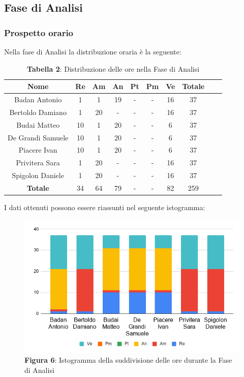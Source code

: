\subsection{Fase di Analisi}
\subsubsection{Prospetto orario}
Nella fase di Analisi la distribuzione oraria è la seguente:
\begin{table}[H]
	\centering
	\renewcommand{\arraystretch}{1.5}
	\begin{tabular}{|c|c|c|c|c|c|c|c|c|c|}
		\hline
		\rowcolor{lighter-grayer}
Nome & Re & Am & An & Pt & Pm & Ve & Totale \\ \hline
Badan Antonio & 1 & 1 & 19 & - & - & 16 & 37 \\ \hline
Bertoldo Damiano & 1 & 20 & - & - & - & 16 & 37 \\ \hline
Budai Matteo & 10 & 1 & 20 & - & - & 6 & 37 \\ \hline
De Grandi Samuele & 10 & 1 & 20 & - & - & 6 & 37 \\ \hline
Piacere Ivan & 10 & 1 & 20 & - & - & 6 & 37 \\ \hline
Privitera Sara & 1 & 20 & - & - & - & 16 & 37 \\ \hline
Spigolon Daniele & 1 & 20 & - & - & - & 16 & 37 \\ \hline
\textbf{Totale} & 34 & 64 & 79 & - & - & 82 & 259 \\ \hline
		
\end{tabular}
\caption*{\textbf{Tabella 2}: Distribuzione delle ore nella Fase di Analisi\\}
\end{table}	

I dati ottenuti possono essere riassunti nel seguente istogramma:
\begin{figure}[H]
	\centering
	\includegraphics[width=0.7\linewidth]{res/images/IstogrammaFase1.png}
	\caption*{\textbf{Figura 6}: Istogramma della suddivisione delle ore durante la Fase di Analisi}
	\label{fig:Figura2}
\end{figure}


